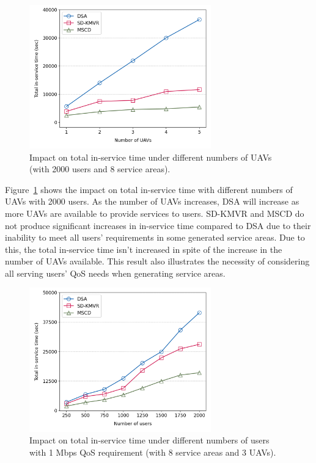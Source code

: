 \documentclass[a4paper,12pt]{report}
\begin{document}
\paragraph{}
\begin{figure} [h!]
    \centering
    \includegraphics[width=0.7\textwidth]{Figure 11.png}
    \caption{Impact on total in-service time under different numbers of UAVs (with 2000 users and 8 service areas).}
    \label{fig:Impact on total in-service time with different numbers of UAVs}
\end{figure}
Figure~\ref{fig:Impact on total in-service time with different numbers of UAVs} shows the impact on total in-service time with different numbers of UAVs with 2000 users. As the number of UAVs increases, DSA will increase as more UAVs are available to provide services to users. SD-KMVR and MSCD do not produce significant increases in in-service time compared to DSA due to their inability to meet all users' requirements in some generated service areas. Due to this, the total in-service time isn't increased in spite of the increase in the number of UAVs available. This result also illustrates the necessity of considering all serving users' QoS needs when generating service areas.

\begin{figure} [h!]
    \centering
    \includegraphics[width=0.7\textwidth]{Figure 12.png}
    \caption{Impact on total in-service time under different numbers of users with 1 Mbps QoS requirement (with 8 service areas and 3 UAVs).}
    \label{fig:Impact on total in-service time under different numbers of users with 1 Mbps QoS requirement}
\end{figure}
\end{document}
